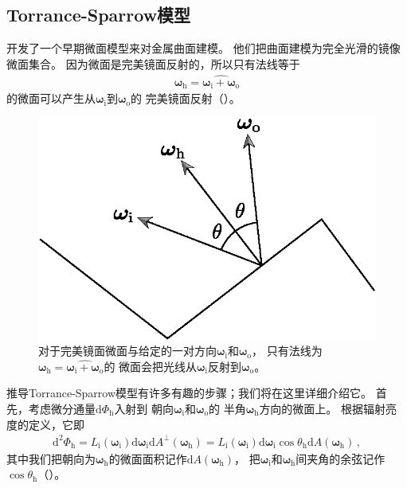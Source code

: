 \subsection{Torrance-Sparrow模型}\label{sub:Torrance-Sparrow模型}
\citet{Torrance:67}开发了一个早期微面模型来对金属曲面建模。
他们把曲面建模为完全光滑的镜像微面集合。
因为微面是完美镜面反射的，所以只有法线等于
\begin{align*}
    {\bm\omega}_{\mathrm{h}}=\widehat{{\bm\omega}_{\mathrm{i}}+{\bm\omega}_{\mathrm{o}}}
\end{align*}
的微面可以产生从${\bm\omega}_{\mathrm{i}}$到${\bm\omega}_{\mathrm{o}}$的
完美镜面反射（）。
\begin{figure}[htbp]
    \centering
    \includegraphics[width=0.5\linewidth]{Pictures/chap08/SpecularMicrofacetReflection.eps}
    \caption{对于完美镜面微面与给定的一对方向${\bm\omega}_{\mathrm{i}}$和${\bm\omega}_{\mathrm{o}}$，
    只有法线为${\bm\omega}_{\mathrm{h}}=\widehat{{\bm\omega}_{\mathrm{i}}+{\bm\omega}_{\mathrm{o}}}$的
    微面会把光线从${\bm\omega}_{\mathrm{i}}$反射到${\bm\omega}_{\mathrm{o}}$。}
    \label{fig:8.19}
\end{figure}

推导Torrance-Sparrow模型有许多有趣的步骤；我们将在这里详细介绍它。
首先，考虑微分通量$\mathrm{d}\varPhi_{\mathrm{h}}$入射到
朝向${\bm\omega}_{\mathrm{i}}$和${\bm\omega}_{\mathrm{o}}$的
半角${\bm\omega}_{\mathrm{h}}$方向的微面上。
根据辐射亮度的定义，它即
\begin{align*}
    \mathrm{d}^2\varPhi_{\mathrm{h}}=L_{\mathrm{i}}({\bm\omega}_{\mathrm{i}})
    \mathrm{d}{\bm\omega}_{\mathrm{i}}\mathrm{d}A^{\perp}({\bm\omega}_{\mathrm{h}})
    =L_{\mathrm{i}}({\bm\omega}_{\mathrm{i}})\mathrm{d}{\bm\omega}_{\mathrm{i}}
    \cos\theta_{\mathrm{h}}\mathrm{d}A({\bm\omega}_{\mathrm{h}})\, ,
\end{align*}
其中我们把朝向为${\bm\omega}_{\mathrm{h}}$的微面面积记作$\mathrm{d}A({\bm\omega}_{\mathrm{h}})$，
把${\bm\omega}_{\mathrm{i}}$和${\bm\omega}_{\mathrm{h}}$间夹角的余弦记作$\cos\theta_{\mathrm{h}}$（）。


